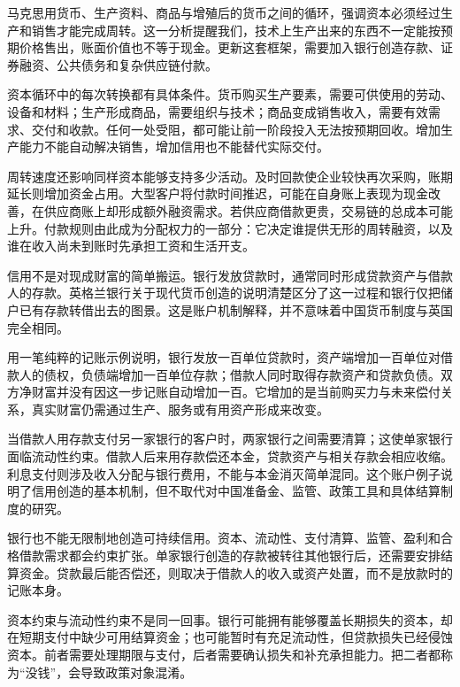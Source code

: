 \documentclass[UTF8,fontset=fandol,zihao=-4,oneside,openany]{ctexbook}
\begin{document}
马克思用货币、生产资料、商品与增殖后的货币之间的循环，强调资本必须经过生产和销售才能完成周转。这一分析提醒我们，技术上生产出来的东西不一定能按预期价格售出，账面价值也不等于现金。更新这套框架，需要加入银行创造存款、证券融资、公共债务和复杂供应链付款。\cite{Marx2}

\label{arg:P097}
资本循环中的每次转换都有具体条件。货币购买生产要素，需要可供使用的劳动、设备和材料；生产形成商品，需要组织与技术；商品变成销售收入，需要有效需求、交付和收款。任何一处受阻，都可能让前一阶段投入无法按预期回收。增加生产能力不能自动解决销售，增加信用也不能替代实际交付。

周转速度还影响同样资本能够支持多少活动。及时回款使企业较快再次采购，账期延长则增加资金占用。大型客户将付款时间推迟，可能在自身账上表现为现金改善，在供应商账上却形成额外融资需求。若供应商借款更贵，交易链的总成本可能上升。付款规则由此成为分配权力的一部分：它决定谁提供无形的周转融资，以及谁在收入尚未到账时先承担工资和生活开支。

信用不是对现成财富的简单搬运。银行发放贷款时，通常同时形成贷款资产与借款人的存款。英格兰银行关于现代货币创造的说明清楚区分了这一过程和银行仅把储户已有存款转借出去的图景。这是账户机制解释，并不意味着中国货币制度与英国完全相同。\cite{BOE2014}

\label{arg:P098}
用一笔纯粹的记账示例说明，银行发放一百单位贷款时，资产端增加一百单位对借款人的债权，负债端增加一百单位存款；借款人同时取得存款资产和贷款负债。双方净财富并没有因这一步记账自动增加一百。它增加的是当前购买力与未来偿付关系，真实财富仍需通过生产、服务或有用资产形成来改变。

当借款人用存款支付另一家银行的客户时，两家银行之间需要清算；这使单家银行面临流动性约束。借款人后来用存款偿还本金，贷款资产与相关存款会相应收缩。利息支付则涉及收入分配与银行费用，不能与本金消灭简单混同。这个账户例子说明了信用创造的基本机制，但不取代对中国准备金、监管、政策工具和具体结算制度的研究。

银行也不能无限制地创造可持续信用。资本、流动性、支付清算、监管、盈利和合格借款需求都会约束扩张。单家银行创造的存款被转往其他银行后，还需要安排结算资金。贷款最后能否偿还，则取决于借款人的收入或资产处置，而不是放款时的记账本身。

\label{arg:P099}
资本约束与流动性约束不是同一回事。银行可能拥有能够覆盖长期损失的资本，却在短期支付中缺少可用结算资金；也可能暂时有充足流动性，但贷款损失已经侵蚀资本。前者需要处理期限与支付，后者需要确认损失和补充承担能力。把二者都称为“没钱”，会导致政策对象混淆。
\end{document}
